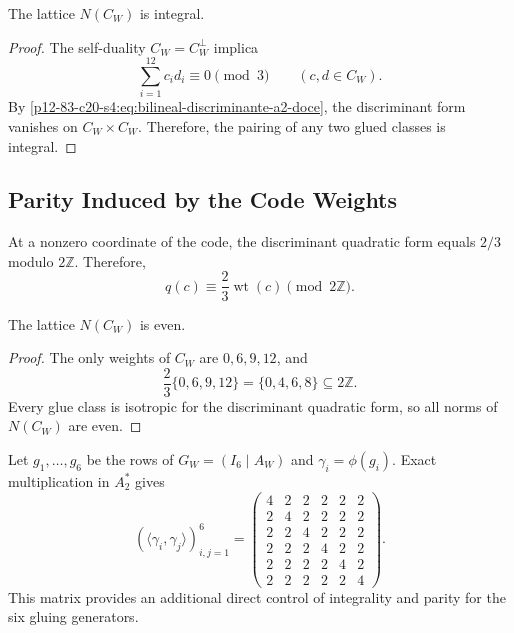 \begin{lemma}
\label{p12-83-c20-s4:lem:integralidad-pegado-cw}
The lattice \(N(C_W)\) is integral.
\end{lemma}

\begin{proof}
The self-duality \(C_W=C_W^\perp\) implica
\[
 \sum_{i=1}^{12}c_id_i\equiv0\pmod3
 \qquad(c,d\in C_W).
\]
By \eqref{p12-83-c20-s4:eq:bilineal-discriminante-a2-doce}, the discriminant form
vanishes on \(C_W\times C_W\). Therefore, the pairing of any
two glued classes is integral.
\end{proof}

\subsection{Parity Induced by the Code Weights}

At a nonzero coordinate of the code, the discriminant quadratic form
equals \(2/3\) modulo \(2\mathbb Z\). Therefore,
\begin{equation}
 q(c)\equiv\frac23\operatorname{wt}(c)\pmod{2\mathbb Z}.
 \label{p12-83-c20-s4:eq:cuadratica-discriminante-cw}
\end{equation}

\begin{lemma}
\label{p12-83-c20-s4:lem:paridad-pegado-cw}
The lattice \(N(C_W)\) is even.
\end{lemma}

\begin{proof}
The only weights of \(C_W\) are \(0,6,9,12\), and
\[
 \frac23\{0,6,9,12\}=\{0,4,6,8\}\subseteq2\mathbb Z.
\]
Every glue class is isotropic for the discriminant quadratic form, so all norms of \(N(C_W)\) are even.
\end{proof}

Let \(g_1,\ldots,g_6\) be the rows of \(G_W=(I_6\mid A_W)\) and
\(\gamma_i=\phi(g_i)\). Exact multiplication in \(A_2^*\) gives
\begin{equation}
 (\langle\gamma_i,\gamma_j\rangle)_{i,j=1}^{6}
 =
 \begin{pmatrix}
 4&2&2&2&2&2\\
 2&4&2&2&2&2\\
 2&2&4&2&2&2\\
 2&2&2&4&2&2\\
 2&2&2&2&4&2\\
 2&2&2&2&2&4
 \end{pmatrix}.
 \label{p12-83-c20-s4:eq:gram-generadores-pegado-cw}
\end{equation}
This matrix provides an additional direct control of integrality and parity for the six gluing generators.

